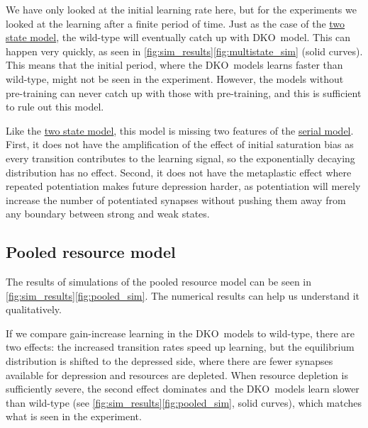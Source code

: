 \documentclass[10pt]{article}
\newcommand{\KO}{DKO}
\begin{document}
We have only looked at the initial learning rate here, but for the experiments we looked at the learning after a finite period of time.
Just as the case of the  \hyperref[sec:binary]{two state model}, the wild-type will eventually catch up with \KO\ model.
This can happen very quickly, as seen in \autoref{fig:sim_results}\ref{fig:multistate_sim} (solid curves).
This means that the initial period, where the \KO\ models learns faster than wild-type, might not be seen in the experiment.
However, the models without pre-training can never catch up with those with pre-training, and this is sufficient to rule out this model.


Like the \hyperref[sec:binary]{two state model}, this model is missing two features of the \hyperref[sec:multistate]{serial model}.
First, it does not have the amplification of the effect of initial saturation bias as every transition contributes to the learning signal, so the exponentially decaying distribution has no effect.
Second, it does not have the metaplastic effect where repeated potentiation makes future depression harder, as potentiation will merely increase the number of potentiated synapses without pushing them away from any boundary between strong and weak states.





\subsection{Pooled resource model}\label{sec:pooled}
%
%
%
%


The results of simulations of the pooled resource model can be seen in
\autoref{fig:sim_results}\ref{fig:pooled_sim}. %
The numerical results can help us understand it qualitatively.

If we compare gain-increase learning in the \KO\ models to wild-type, there are two effects: the increased transition rates speed up learning, but the equilibrium distribution is shifted to the depressed side,
where there are fewer synapses available for depression and resources are depleted.
When resource depletion is sufficiently severe, the second effect dominates and the \KO\ models learn slower than wild-type (see \autoref{fig:sim_results}\ref{fig:pooled_sim}, %
solid curves), which matches what is seen in the experiment.
\end{document}

